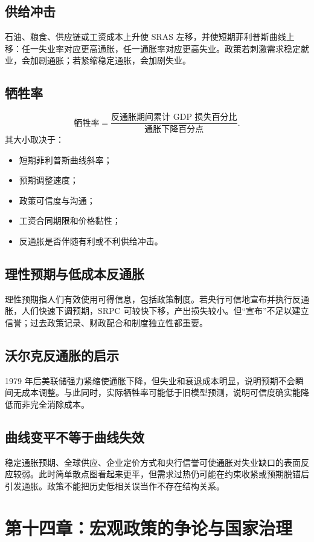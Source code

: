 \documentclass[UTF8,11pt,a4paper]{ctexart}
\begin{document}
\subsection{供给冲击}
石油、粮食、供应链或工资成本上升使 SRAS 左移，并使短期菲利普斯曲线上移：任一失业率对应更高通胀，任一通胀率对应更高失业。政策若刺激需求稳定就业，会加剧通胀；若紧缩稳定通胀，会加剧失业。

\subsection{牺牲率}
\[
\text{牺牲率}=\frac{\text{反通胀期间累计 GDP 损失百分比}}{\text{通胀下降百分点}}.
\]
其大小取决于：
\begin{itemize}
  \item 短期菲利普斯曲线斜率；
  \item 预期调整速度；
  \item 政策可信度与沟通；
  \item 工资合同期限和价格黏性；
  \item 反通胀是否伴随有利或不利供给冲击。
\end{itemize}

\subsection{理性预期与低成本反通胀}
理性预期指人们有效使用可得信息，包括政策制度。若央行可信地宣布并执行反通胀，人们快速下调预期，SRPC 可较快下移，产出损失较小。但“宣布”不足以建立信誉；过去政策记录、财政配合和制度独立性都重要。

\subsection{沃尔克反通胀的启示}
1979 年后美联储强力紧缩使通胀下降，但失业和衰退成本明显，说明预期不会瞬间无成本调整。与此同时，实际牺牲率可能低于旧模型预测，说明可信度确实能降低而非完全消除成本。

\subsection{曲线变平不等于曲线失效}
稳定通胀预期、全球供应、企业定价方式和央行信誉可使通胀对失业缺口的表面反应较弱。此时简单散点图看起来更平，但需求过热仍可能在约束收紧或预期脱锚后引发通胀。政策不能把历史低相关误当作不存在结构关系。

\newpage
\section{第十四章：宏观政策的争论与国家治理}
\end{document}

